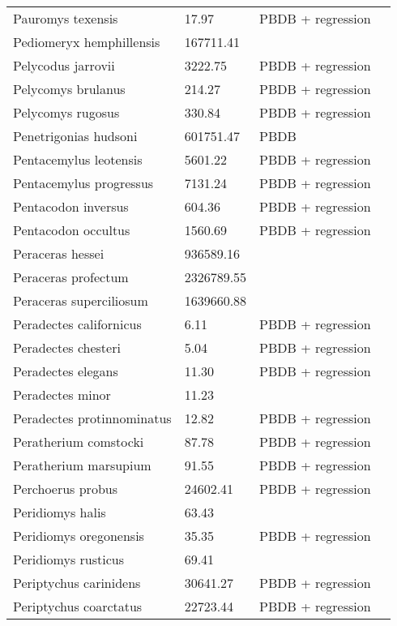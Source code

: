 \documentclass{article}
\begin{document}
\begin{center}
\begin{longtable}{p{} p{} p{} p{}}
    Pauromys texensis & 17.97 & PBDB + regression &  \\ 
    Pediomeryx hemphillensis & 167711.41 & \cite{Tomiya2013} &  \\ 
    Pelycodus jarrovii & 3222.75 & PBDB + regression &  \\ 
    Pelycomys brulanus & 214.27 & PBDB + regression &  \\ 
    Pelycomys rugosus & 330.84 & PBDB + regression &  \\ 
    Penetrigonias hudsoni & 601751.47 & PBDB &  \\ 
    Pentacemylus leotensis & 5601.22 & PBDB + regression &  \\ 
    Pentacemylus progressus & 7131.24 & PBDB + regression &  \\ 
    Pentacodon inversus & 604.36 & PBDB + regression &  \\ 
    Pentacodon occultus & 1560.69 & PBDB + regression &  \\ 
    Peraceras hessei & 936589.16 & \cite{Tomiya2013} &  \\ 
    Peraceras profectum & 2326789.55 & \cite{Tomiya2013} &  \\ 
    Peraceras superciliosum & 1639660.88 & \cite{Tomiya2013} &  \\ 
    Peradectes californicus & 6.11 & PBDB + regression &  \\ 
    Peradectes chesteri & 5.04 & PBDB + regression &  \\ 
    Peradectes elegans & 11.30 & PBDB + regression &  \\ 
    Peradectes minor & 11.23 & \cite{Taylor1976} &  \\ 
    Peradectes protinnominatus & 12.82 & PBDB + regression &  \\ 
    Peratherium comstocki & 87.78 & PBDB + regression &  \\ 
    Peratherium marsupium & 91.55 & PBDB + regression &  \\ 
    Perchoerus probus & 24602.41 & PBDB + regression &  \\ 
    Peridiomys halis & 63.43 & \cite{Tomiya2013} &  \\ 
    Peridiomys oregonensis & 35.35 & PBDB + regression &  \\ 
    Peridiomys rusticus & 69.41 & \cite{Tomiya2013} &  \\ 
    Periptychus carinidens & 30641.27 & PBDB + regression &  \\ 
    Periptychus coarctatus & 22723.44 & PBDB + regression &  \\ 

\end{longtable}
\end{center}
\end{document}
